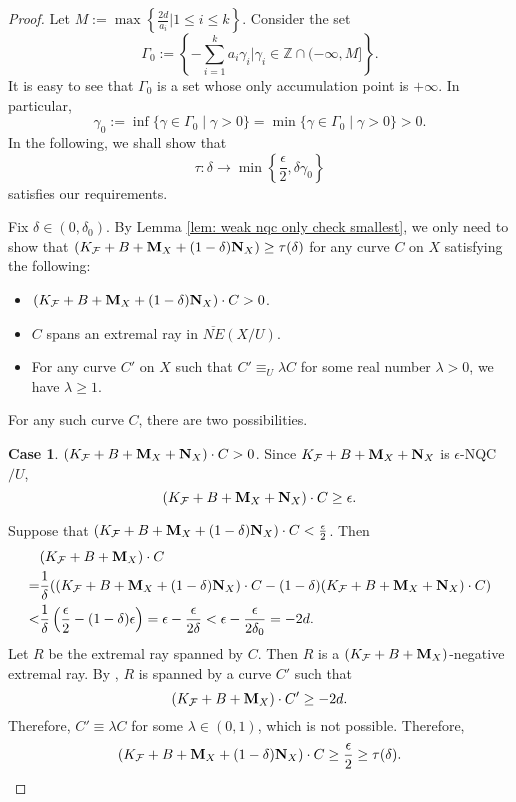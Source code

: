 \documentclass[11pt]{amsart}
\numberwithin{equation}{section}
\newcommand{\Mm}{{\bf{M}}}
\newcommand{\Nn}{{\bf{N}}}
\newcommand{\Ff}{\mathcal{F}}
\newcommand{\Ii}{\Gamma}
\theoremstyle{definition}
\theoremstyle{definition}
\theoremstyle{definition}
\begin{document}
\begin{proof}
Let $M:=\max\left\{\frac{2d}{a_i}\Big| 1\leq i\leq k\right\}$. Consider the set
$$\Ii_0:=\left\{-\sum_{i=1}^ka_i\gamma_i\Bigg| \gamma_i\in\mathbb Z\cap (-\infty,M]\right\}.$$
It is easy to see that $\Ii_0$ is a set whose only accumulation point is $+\infty$. In particular,
$$\gamma_0:=\inf\{\gamma\in\Ii_0\mid \gamma>0\}=\min\{\gamma\in\Ii_0\mid\gamma>0\}>0.$$
In the following, we shall show that
$$\tau: \delta\rightarrow\min\left\{\frac{\epsilon}{2},\delta\gamma_0\right\}$$
satisfies our requirements.

Fix $\delta\in (0,\delta_0)$. By Lemma \ref{lem: weak nqc only check smallest}, we only need to show that $(K_{\Ff}+B+\Mm_X+(1-\delta)\Nn_X)\geq\tau(\delta)$ for any curve $C$ on $X$ satisfying the following:
\begin{itemize}
    \item $(K_{\Ff}+B+\Mm_X+(1-\delta)\Nn_X)\cdot C>0$.
    \item $C$ spans an extremal ray in $\overline{NE}(X/U)$.
    \item For any curve $C'$ on $X$ such that $C'\equiv_U\lambda C$ for some real number $\lambda>0$, we have $\lambda\geq 1$. 
\end{itemize}
For any such curve $C$, there are two possibilities.

\medskip

\noindent\textbf{Case 1}. $(K_{\Ff}+B+\Mm_X+\Nn_X)\cdot C>0$. Since $K_{\Ff}+B+\Mm_X+\Nn_X$ is $\epsilon$-NQC$/U$, $$(K_{\Ff}+B+\Mm_X+\Nn_X)\cdot C\geq\epsilon.$$ 

Suppose that $(K_{\Ff}+B+\Mm_X+(1-\delta)\Nn_X)\cdot C<\frac{\epsilon}{2}$. Then
\begin{align*}
    &(K_{\Ff}+B+\Mm_X)\cdot C\\
    =&\frac{1}{\delta}((K_{\Ff}+B+\Mm_X+(1-\delta)\Nn_X)\cdot C-(1-\delta)(K_{\Ff}+B+\Mm_X+\Nn_X)\cdot C)\\
    <&\frac{1}{\delta}\left(\frac{\epsilon}{2}-(1-\delta)\epsilon\right)=\epsilon-\frac{\epsilon}{2\delta}<\epsilon-\frac{\epsilon}{2\delta_0}=-2d.
\end{align*}
Let $R$ be the extremal ray spanned by $C$. Then $R$ is a $(K_{\Ff}+B+\Mm_X)$-negative extremal ray. By \cite[Theorem 2.3.1]{CHLX23}, $R$ is spanned by a curve $C'$ such that 
$$(K_{\Ff}+B+\Mm_X)\cdot C'\geq-2d.$$
Therefore, $C'\equiv \lambda C$ for some $\lambda\in (0,1)$, which is not possible. Therefore, 
$$(K_{\Ff}+B+\Mm_X+(1-\delta)\Nn_X)\cdot C\geq\frac{\epsilon}{2}\geq\tau(\delta).$$


\end{proof}
\end{document}
